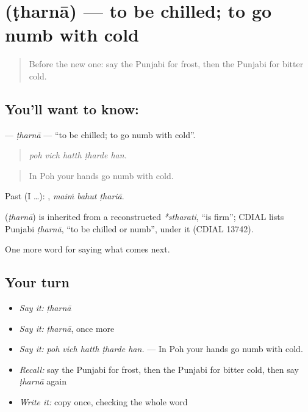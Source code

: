 \section[\texorpdfstring{\pa{ਠਰਨਾ} (ṭharnā)}{ਠਰਨਾ (ṭharnā)}]{ (ṭharnā) — to be chilled; to go numb with cold}

\label{lesson:PA-C289-tharna}



\begin{quote}
Before the new one: say the Punjabi for frost, then the Punjabi for bitter cold.
\end{quote}

\subsection*{You'll want to know: }
\textbf{} — \emph{ṭharnā} — \textquotedblleft{}to be chilled; to go numb with cold\textquotedblright{}.

\begin{quote}
    
\end{quote}

\begin{quote}
\emph{poh vich hatth ṭharde han.}
\end{quote}

\begin{quote}
In Poh your hands go numb with cold.
\end{quote}

Past (I …):   , \emph{maiṁ bahut ṭhariā}.

\begin{cousinweb}
\textbf{} (\emph{ṭharnā}) is inherited from a reconstructed \emph{*stharati}, \textquotedblleft{}is firm\textquotedblright{}; CDIAL lists Punjabi \emph{ṭharnā}, \textquotedblleft{}to be chilled or numb\textquotedblright{}, under it (CDIAL 13742).
\end{cousinweb}

\begin{grammarlens}[title={What you've built}]
One more word for saying what comes next.
\end{grammarlens}

\subsection*{Your turn}
\begin{itemize}
\raggedright
  \item \emph{Say it:} \emph{ṭharnā}
  \item \emph{Say it:} \emph{ṭharnā}, once more
  \item \emph{Say it:} \emph{poh vich hatth ṭharde han.} — In Poh your hands go numb with cold.
  \item \emph{Recall:} say the Punjabi for frost, then the Punjabi for bitter cold, then say \emph{ṭharnā} again
  \item \emph{Write it:} copy \textbf{} once, checking the whole word
\end{itemize}


